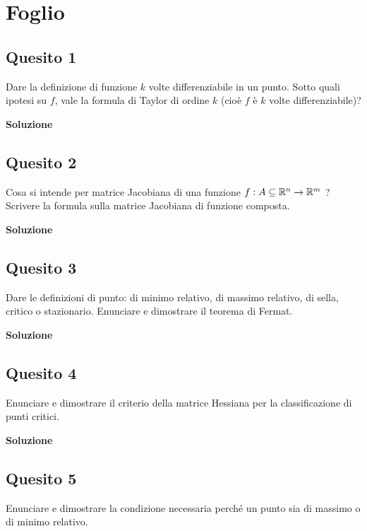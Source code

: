 \chapter{Foglio \ \thechapter}


\section*{Quesito 1}
Dare la definizione di funzione $k$ volte differenziabile in un punto. Sotto quali
ipotesi su $f$, vale la formula di Taylor di ordine $k$ (cioè $f$ è $k$ volte differenziabile)?


\medskip
\begin{large}
\textbf{Soluzione}
\end{large}


\section*{Quesito 2}
Cosa si intende per matrice Jacobiana di una funzione 
$f : A \subseteq \mathbb{R}^n \to \mathbb{R}^m$ ?
Scrivere la formula sulla matrice Jacobiana di funzione composta.


\medskip
\begin{large}
\textbf{Soluzione}
\end{large}


\section*{Quesito 3}
Dare le definizioni di punto: di minimo relativo, di massimo relativo, di sella,
critico o stazionario. Enunciare e dimostrare il teorema di Fermat.


\medskip
\begin{large}
\textbf{Soluzione}
\end{large}


\section*{Quesito 4}
Enunciare e dimostrare il criterio della matrice Hessiana per la classificazione
di punti critici.


\medskip
\begin{large}
\textbf{Soluzione}
\end{large}


\section*{Quesito 5}
Enunciare e dimostrare la condizione necessaria perché un punto sia di massimo o di minimo relativo.

